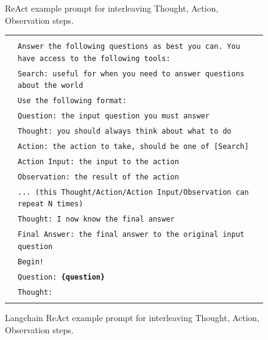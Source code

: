 {\begin{figure}[p]
\begin{center}
\begin{tabular}{|rp{\pWidth}|}
&\\\hline\end{tabular}
\caption{ReAct example prompt for interleaving Thought, Action, Observation steps.}
\label{fig:ReAct_prompt}
\end{center}
\end{figure}

} %

{ %
\newcommand{\pWidth}{5in}
\newcommand{\pStart}{\setcounter{pCount}{1}}
\newcommand{\pRow}[1]{\texttt{\fontsize{6pt}{1pt}\selectfont\color{gray}\arabic{pCount}}&\texttt{\fontsize{6pt}{1pt}\selectfont#1}\stepcounter{pCount}\\}
\newcommand{\pVar}[1]{\textbf{\{#1\}}}
\newcommand{\pBlank}{\_\_\_\_\_}
\begin{figure}[p]
\begin{center}\scriptsize
\begin{tabular}{|rp{\pWidth}|}\hline\pStart&\\
\pRow{Answer the following questions as best you can. You have access to the following tools:}
\pRow{Search: useful for when you need to answer questions about the world}
\pRow{Use the following format:}
\pRow{Question: the input question you must answer}
\pRow{Thought: you should always think about what to do}
\pRow{Action: the action to take, should be one of [Search]}
\pRow{Action Input: the input to the action}
\pRow{Observation: the result of the action}
\pRow{... (this Thought/Action/Action Input/Observation can repeat N times)}
\pRow{Thought: I now know the final answer}
\pRow{Final Answer: the final answer to the original input question}
\pRow{Begin!}
\pRow{Question: \pVar{question}}
\pRow{Thought:}
&\\\hline\end{tabular}
\caption{Langchain ReAct example prompt for interleaving Thought, Action, Observation steps.}
\label{fig:Langchain_ReAct_prompt}
\end{center}
\end{figure}

} %


